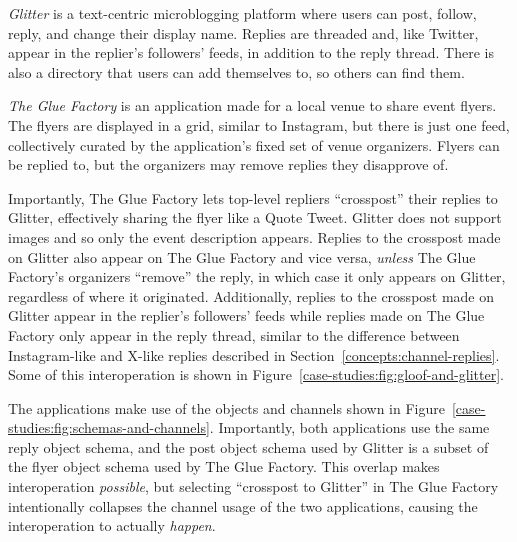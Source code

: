 \emph{Glitter} is a text-centric microblogging platform
where users can post, follow, reply, and change their display name.
Replies are threaded and, like Twitter, appear in the replier's followers' feeds, in addition to the reply thread.
There is also a directory that users can add themselves to,
so others can find them.

\emph{The Glue Factory} is an application made for a local
venue to share event flyers.
The flyers are displayed in a grid, similar to Instagram,
but there is just one feed, collectively curated by
the application's fixed set of venue organizers.
Flyers can be replied to, but the organizers may remove replies they disapprove of.

Importantly, The Glue Factory lets
top-level repliers ``crosspost'' their replies
to Glitter, effectively sharing the flyer like a Quote Tweet.
Glitter does not support images and so only the
event description appears.
Replies to the crosspost made on Glitter also appear on The Glue Factory
and vice versa, \emph{unless} The Glue Factory's organizers ``remove'' the reply,
in which case it only appears on Glitter, regardless of where it originated.
Additionally, replies to the crosspost made on Glitter appear in the replier's followers'
feeds while replies made on The Glue Factory only appear in the reply thread,
similar to the difference between Instagram-like and X-like replies described in Section~\ref{concepts:channel-replies}.
Some of this interoperation is shown in Figure~\ref{case-studies:fig:gloof-and-glitter}.


The applications make use of the objects and channels
shown in Figure~\ref{case-studies:fig:schemas-and-channels}.
Importantly, both applications use the same reply object schema,
and the post object schema used by Glitter is a subset of the flyer
object schema used by The Glue Factory.
This overlap makes interoperation \emph{possible},
but selecting ``crosspost to Glitter'' in The Glue Factory intentionally collapses the
channel usage of the two applications,
causing the interoperation to actually \emph{happen}.

